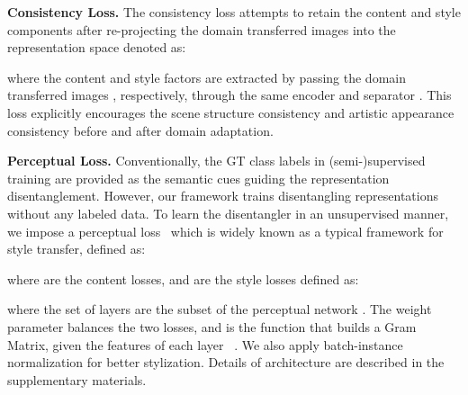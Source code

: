 \documentclass[final]{cvpr}
\begin{document}
\textbf{Consistency Loss.} \quad
The consistency loss attempts to retain the content and style components after re-projecting the domain transferred images into the representation space denoted as:

where the content  and style  factors are extracted by passing the domain transferred images , respectively, through the same encoder  and separator .
This loss explicitly encourages the scene structure consistency and artistic appearance consistency before and after domain adaptation.

\textbf{Perceptual Loss.} \quad
Conventionally, the GT class labels in (semi-)supervised training are provided as the semantic cues guiding the representation disentanglement.
However, our framework trains disentangling representations without any labeled data.
To learn the disentangler in an unsupervised manner, we impose a perceptual loss~\cite{johnson2016perceptual} which is widely known as a typical framework for style transfer, defined as:

where  are the content losses, and  are the style losses defined as:

where the set of layers  are the subset of the perceptual network . The weight parameter  balances the two losses, and  is the function that builds a Gram Matrix, given the features of each layer ~\cite{gatys2015texture}.
We also apply batch-instance normalization \cite{nam2018batch} for better stylization.
Details of architecture are described in the supplementary materials.
\end{document}
